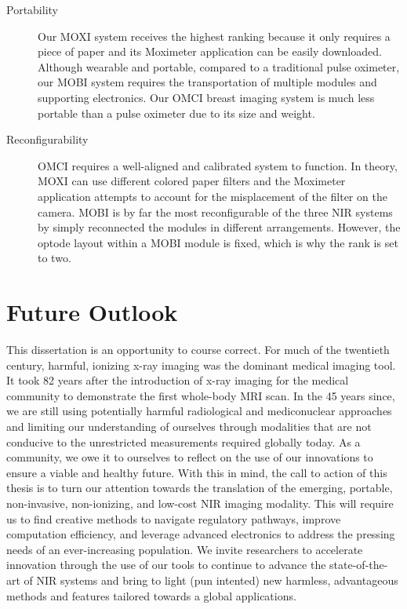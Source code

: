 \begin{description}
   \item[Portability] Our \ac{MOXI} system receives the highest ranking because it only requires a piece of paper and its Moximeter application can be easily downloaded. Although wearable and portable, compared to a traditional pulse oximeter, our \ac{MOBI} system requires the transportation of multiple modules and supporting electronics. Our \ac{OMCI} breast imaging system is much less portable than a pulse oximeter due to its size and weight.
   
   \item[Reconfigurability] \ac{OMCI} requires a well-aligned and calibrated system to function. In theory, \ac{MOXI} can use different colored paper filters and the Moximeter application attempts to account for the misplacement of the filter on the camera. \ac{MOBI} is by far the most reconfigurable of the three \ac{NIR} systems by simply reconnected the modules in different arrangements. However, the optode layout within a \ac{MOBI} module is fixed, which is why the rank is set to two. 
\end{description}


\section{Future Outlook}
This dissertation is an opportunity to course correct. For much of the twentieth century, harmful, ionizing x-ray imaging was the dominant medical imaging tool. It took 82 years after the introduction of x-ray imaging for the medical community to demonstrate the first whole-body \ac{MRI} scan. In the 45 years since, we are still using potentially harmful radiological and mediconuclear approaches and limiting our understanding of ourselves through modalities that are not conducive to the unrestricted measurements required globally today. As a community, we owe it to ourselves to reflect on the use of our innovations to ensure a viable and healthy future. With this in mind, the call to action of this thesis is to turn our attention towards the translation of the emerging, portable, non-invasive, non-ionizing, and low-cost \ac{NIR} imaging modality. This will require us to find creative methods to navigate regulatory pathways, improve computation efficiency, and leverage advanced electronics to address the pressing needs of an ever-increasing population. We invite researchers to accelerate innovation through the use of our tools to continue to advance the state-of-the-art of \ac{NIR} systems and bring to light (pun intented) new harmless, advantageous methods and features tailored towards a global applications. 